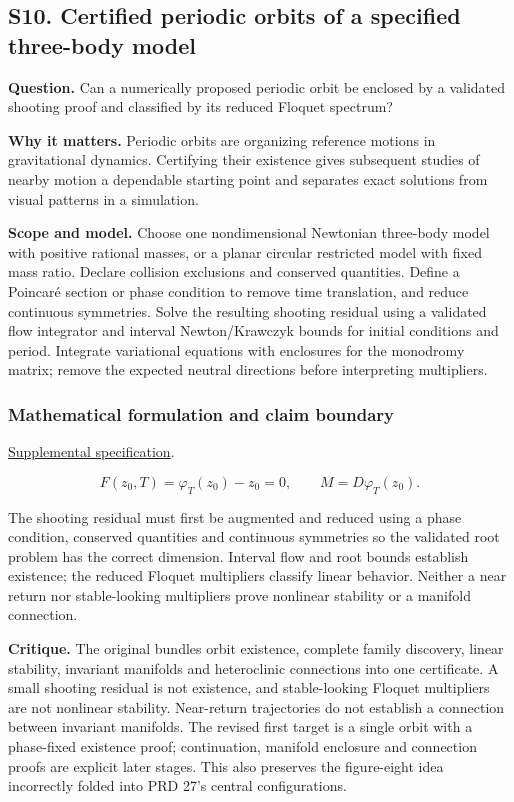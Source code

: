 \documentclass[
  11pt,
]{article}
\begin{document}
\subsection{S10. Certified periodic orbits of a specified three-body
model}

\textbf{Question.} Can a numerically proposed periodic orbit be enclosed
by a validated shooting proof and classified by its reduced Floquet
spectrum?

\textbf{Why it matters.} Periodic orbits are organizing reference
motions in gravitational dynamics. Certifying their existence gives
subsequent studies of nearby motion a dependable starting point and
separates exact solutions from visual patterns in a simulation.

\textbf{Scope and model.} Choose one nondimensional Newtonian three-body
model with positive rational masses, or a planar circular restricted
model with fixed mass ratio. Declare collision exclusions and conserved
quantities. Define a Poincaré section or phase condition to remove time
translation, and reduce continuous symmetries. Solve the resulting
shooting residual using a validated flow integrator and interval
Newton/Krawczyk bounds for initial conditions and period. Integrate
variational equations with enclosures for the monodromy matrix; remove
the expected neutral directions before interpreting multipliers.

\subsubsection{Mathematical formulation and claim boundary}

\href{https://github.com/rick-stevens-ai/Pure-Thought/blob/main/supplemental/S10.md}{Supplemental
specification}.

\[F(z_0,T)=\varphi_T(z_0)-z_0=0,\qquad
M=D\varphi_T(z_0).\]

The shooting residual must first be augmented and reduced using a phase
condition, conserved quantities and continuous symmetries so the
validated root problem has the correct dimension. Interval flow and root
bounds establish existence; the reduced Floquet multipliers classify
linear behavior. Neither a near return nor stable-looking multipliers
prove nonlinear stability or a manifold connection.

\textbf{Critique.} The original bundles orbit existence, complete family
discovery, linear stability, invariant manifolds and heteroclinic
connections into one certificate. A small shooting residual is not
existence, and stable-looking Floquet multipliers are not nonlinear
stability. Near-return trajectories do not establish a connection
between invariant manifolds. The revised first target is a single orbit
with a phase-fixed existence proof; continuation, manifold enclosure and
connection proofs are explicit later stages. This also preserves the
figure-eight idea incorrectly folded into PRD 27's central
configurations.
\end{document}
